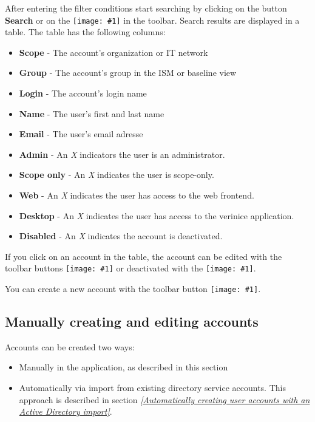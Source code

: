 \documentclass[a4paper,10pt]{book}
\newcommand{\icon}[1]{\texttt{[image: \#1]}}
\begin{document}
After entering the filter conditions start searching by clicking on the button \textbf{Search} or on the \icon{Icon/search.png} in the toolbar. Search results are displayed in a table. The table has the following columns:
\begin{itemize}
\item \textbf{Scope} - The account’s organization or IT network
\item \textbf{Group} - The account’s group in the ISM or baseline view
\item \textbf{Login} - The account’s login name
\item \textbf{Name} - The user’s first and last name
\item \textbf{Email} - The user’s email adresse
\item \textbf{Admin} - An \textit{X} indicators the user is an administrator.
\item \textbf{Scope only} - An \textit{X} indicates the user is scope-only.
\item \textbf{Web} - An \textit{X} indicates the user has access to the web frontend.
\item \textbf{Desktop} - An \textit{X} indicates the user has access to the verinice application.
\item \textbf{Disabled} - An \textit{X} indicates the account is deactivated.
\end{itemize}

If you click on an account in the table, the account can be edited with the toolbar buttons \icon{Icon/Edit.png} or deactivated with the \icon{Icon/user_disabled.png}.

You can create a new account with the toolbar button \icon{Icon/user_add.png}.

\subsection{Manually creating and editing accounts}
\label{sec:editing-accounts}

Accounts can be created two ways:
\begin{itemize}
\item Manually in the application, as described in this section
\item Automatically via import from existing directory service accounts. This approach is described in section {\em \ref{Automatically
      creating user accounts with an Active Directory import}}.
\end{itemize}
\end{document}
